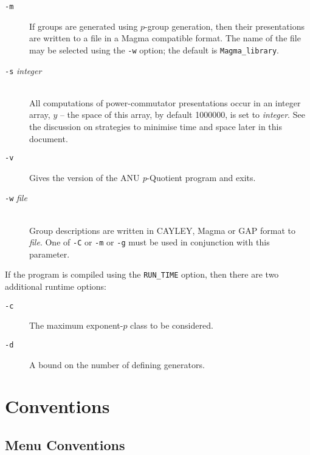 \documentclass[12pt]{article}
\begin{document}
\begin{description}
\item[\texttt{-m}\hspace*{1em}]
      If groups are generated using $p$-group generation, then 
      their presentations are written to a file
      in a {\sc Magma} compatible format.
      The name of the file may be selected using the \texttt{-w} option;
      the default is \texttt{Magma\_library}.

\item[\texttt{-s} {\it integer}]\ \\
      All computations of power-commutator presentations occur
      in an integer array, $y$ -- the space of this array,  by 
      default 1000000, is set to {\em integer}. See the discussion
      on strategies to minimise time and space later in this document.

\item[\texttt{-v}\hspace*{1em}]
      Gives the version of the ANU {\it p}-Quotient program and exits.

\item[\texttt{-w} {\it file}]\ \\
      Group descriptions are written in CAYLEY, {\sc Magma} or {\sf GAP} 
      format to {\em file}. One of \texttt{-C} or \texttt{-m} or \texttt{-g}
      must be used in conjunction with this parameter.

\end{description}

If the program is compiled using the \texttt{RUN\_TIME} option, then
there are two additional runtime options:

\begin{description}

\item[\texttt{-c}\hspace*{1em}]
The maximum exponent-$p$ class to be considered.

\item[\texttt{-d}\hspace*{1em}]
A bound on the number of defining generators.

\end{description}

\pagebreak
\section{Conventions}\label{sec:conventions}
\subsection{Menu Conventions}
\end{document}
